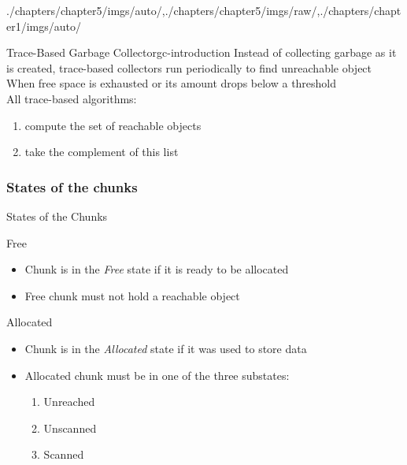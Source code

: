 \begin{graphicspathcontext}{{./chapters/chapter5/imgs/auto/},{./chapters/chapter5/imgs/raw/},{./chapters/chapter1/imgs/auto/}}
\begin{bibunit}[apalike]
\begin{leftlawnframe}{Trace-Based Garbage Collector}{gc-introduction}
	Instead of collecting garbage as it is created, trace-based collectors run periodically to find unreachable object \\[.5cm]
	When free space is exhausted or its amount drops below a threshold \\[.5cm]
	All trace-based algorithms:
	\begin{enumerate}
		\item compute the set of reachable objects
		\item take the complement of this list
	\end{enumerate}
\end{leftlawnframe}

\subsubsection{States of the chunks}
\subsubsectiontableofcontentslide

\begin{frame}[t]{States of the Chunks}
	\vspace{-2pt}
	\begin{definitionblock}{Free}
		\begin{itemize}
			\item Chunk is in the \emph{Free} state if it is ready to be allocated
			\item Free chunk must not hold a reachable object
		\end{itemize}
	\end{definitionblock}
	\begin{definitionblock}{Allocated}
		\begin{itemize}
			\item Chunk is in the \emph{Allocated} state if it was used to store data
			\item Allocated chunk must be in one of the three substates:
			\begin{enumerate}
				\item Unreached
				\item Unscanned
				\item Scanned
			\end{enumerate}
		\end{itemize}
	\end{definitionblock}
	\begin{center}
	\end{center}
\end{frame}


\end{bibunit}
\end{graphicspathcontext}
